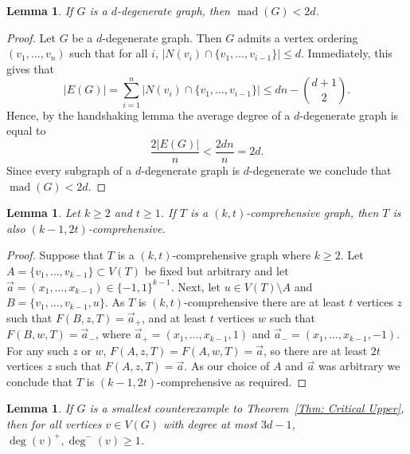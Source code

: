 \documentclass[11pt]{article}
\newtheorem{lemma}[theorem]{Lemma}
\theoremstyle{definition}
\DeclareMathOperator{\mad}{\text{mad}}
\begin{document}
\begin{lemma}\label{Lemma: MAD}
    If $G$ is a $d$-degenerate graph, then $\mad(G) < 2d$.
\end{lemma}

\begin{proof}
    Let $G$ be a $d$-degenerate graph.
    Then $G$ admits a vertex ordering $(v_1,\dots, v_n)$ such that for all $i$,
    $|N(v_i)\cap \{v_1,\dots, v_{i-1}\}|\leq d$.
    Immediately, this gives that 
    \[
    |E(G)| = \sum_{i=1}^n |N(v_i)\cap \{v_1,\dots, v_{i-1}\}| \leq dn-\binom{d+1}{2}.
    \]
    Hence, by the handshaking lemma the average degree of a $d$-degenerate graph is equal to
    \[
    \frac{2|E(G)|}{n} < \frac{2dn}{n} = 2d.
    \]
    Since every subgraph of a $d$-degenerate graph is $d$-degenerate we conclude that $\mad(G) < 2d$.
\end{proof}



\begin{lemma}\label{Lemma: comp->}
    Let $k\geq 2$ and $t\geq 1$.
    If $T$ is a $(k,t)$-comprehensive graph, then $T$ is also $(k-1,2t)$-comprehensive.
\end{lemma}

\begin{proof}
    Suppose that $T$ is a $(k,t)$-comprehensive graph where $k\geq 2$. Let $A = \{v_1,\dots, v_{k-1}\} \subset V(T)$ be fixed but arbitrary and let ${\vec a} = (x_1,\dots, x_{k-1}) \in \{-1,1\}^{k-1}$. Next, let $u \in V(T)\setminus A$ and $B = \{v_1,\dots, v_{k-1},u\}$. As $T$ is $(k,t)$-comprehensive there are at least $t$ vertices $z$ such that $F(B,z,T) = {\vec a}_+$, and at least $t$ vertices $w$ such that $F(B,w,T) = {\vec a}_-$, where ${\vec a}_+ = (x_1,\dots, x_{k-1},1)$ and ${\vec a}_- = (x_1,\dots, x_{k-1},-1)$. For any such $z$ or $w$, $F(A,z,T)=F(A,w,T) = {\vec a}$, so there are at least $2t$ vertices $z$ such that $F(A,z,T)= {\vec a}$. As our choice of $A$ and ${\vec a}$ was arbitrary we conclude that $T$ is $(k-1,2t)$-comprehensive as required.
\end{proof}

\begin{lemma}\label{Lemma: counter-no-oneway}
    If $G$ is a smallest counterexample to Theorem~\ref{Thm: Critical Upper},
    then for all vertices $v \in V(G)$ with degree at most $3d-1$,
    $\deg(v)^+,\deg^-(v)\geq 1$.
\end{lemma}
\end{document}

